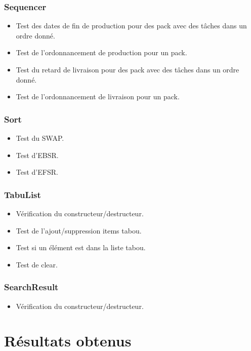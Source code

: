 \documentclass[hideweeklyreports]{polytech/polytech}
\begin{document}
			\subsection{Sequencer}
				\begin{itemize}
					\item Test des dates de fin de production pour des pack avec des tâches dans un ordre donné.
					\item Test de l'ordonnancement de production pour un pack.
					\item Test du retard de livraison pour des pack avec des tâches dans un ordre donné.
					\item Test de l'ordonnancement de livraison pour un pack.
				\end{itemize}
				
			\subsection{Sort}
				\begin{itemize}
					\item Test du SWAP.
					\item Test d'EBSR.
					\item Test d'EFSR.
				\end{itemize}
				
			\subsection{TabuList}
				\begin{itemize}
					\item Vérification du constructeur/destructeur.
					\item Test de l'ajout/suppression items tabou.
					\item Test si un élément est dans la liste tabou.
					\item Test de clear.
				\end{itemize}
				
			\subsection{SearchResult}
				\begin{itemize}
					\item Vérification du constructeur/destructeur.
				\end{itemize}
		
	\chapter{Résultats obtenus}
\end{document}
